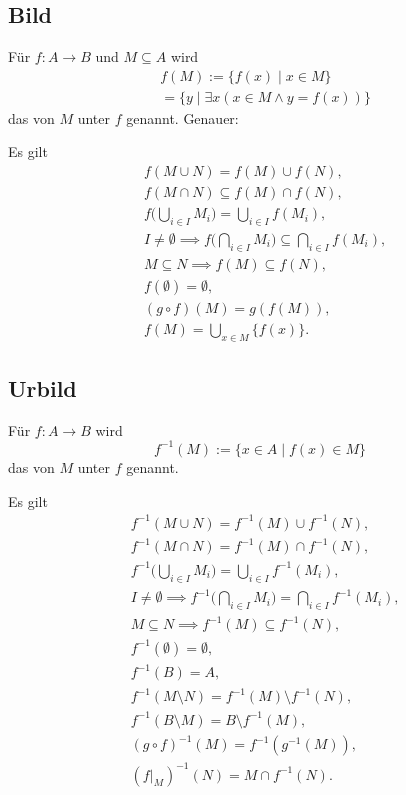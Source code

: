 \newpage
\subsection{Bild}
\begin{definition}[Bild]
Für $f\colon A\to B$ und $M\subseteq A$ wird
\begin{equation}
\begin{split}
&f(M) := \{f(x)\mid x\in M\}\\
& = \{y\mid \exists x(x\in M\land y=f(x))\}
\end{split}
\end{equation}
das  von $M$ unter $f$ genannt. Genauer:
\end{definition}
Es gilt
\begin{align}
&f(M\cup N) = f(M)\cup f(N),\\
&f(M\cap N) \subseteq f(M)\cap f(N),\\
&f\Big(\bigcup_{i\in I}M_i\Big) = \bigcup_{i\in I} f(M_i),\\
&I\ne\emptyset\implies f\Big(\bigcap_{i\in I} M_i\Big) \subseteq \bigcap_{i\in I} f(M_i),\\
&M\subseteq N\implies f(M)\subseteq f(N),\\
&f(\emptyset) = \emptyset,\\
&(g\circ f)(M) = g(f(M)),\\
&f(M) = \bigcup_{x\in M} \{f(x)\}.
\end{align}

\subsection{Urbild}
\begin{definition}[Urbild]
Für $f\colon A\to B$ wird
\begin{equation}
f^{-1}(M) := \{x\in A\mid f(x)\in M\}
\end{equation}
das  von $M$ unter $f$ genannt.
\end{definition}
Es gilt
\begin{align}
& f^{-1}(M\cup N) = f^{-1}(M)\cup f^{-1}(N),\\
& f^{-1}(M\cap N) = f^{-1}(M)\cap f^{-1}(N),\\
& f^{-1}\Big(\bigcup_{i\in I}M_i\Big) = \bigcup_{i\in I} f^{-1}(M_i),\\
& I\ne\emptyset\implies f^{-1}\Big(\bigcap_{i\in I} M_i\Big) = \bigcap_{i\in I}f^{-1}(M_i),\\
& M\subseteq N\implies f^{-1}(M)\subseteq f^{-1}(N),\\
& f^{-1}(\emptyset) = \emptyset,\\
& f^{-1}(B) = A,\\
& f^{-1}(M\setminus N) = f^{-1}(M)\setminus f^{-1}(N),\\
& f^{-1}(B\setminus M) = B\setminus f^{-1}(M),\\
& (g\circ f)^{-1}(M) = f^{-1}(g^{-1}(M)),\\
& (f|_M)^{-1}(N) = M\cap f^{-1}(N).
\end{align}

